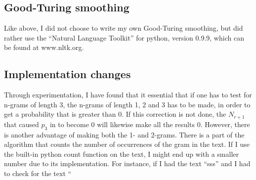 \subsection{Good-Turing smoothing}
Like above, I did not choose to write my own Good-Turing smoothing, but did rather use the ``Natural Language Toolkit'' for python, version 0.9.9, which can be found at www.nltk.org.

\subsection{Implementation changes}
Through experimentation, I have found that it essential that if one has to test for n-grams of length 3, the n-grams of length 1, 2 and 3 has to be made, in order to get a probability that is greater than 0. If this correction is not done, the $N_{r+1}$ that caused $p_3$ in  to become 0 will likewise make all the results 0. However, there is another advantage of making both the 1- and 2-grams. There is a part of the algorithm that counts the number of occurrences of the gram in the text. If I use the built-in python count function on the text, I might end up with a smaller number due to its implementation. For instance, if I had the text ``sss'' and I had to check for the text ``
